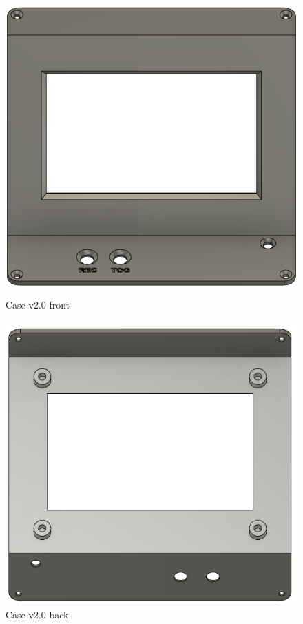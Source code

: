\begin{figure}[htbp]
    \centering
    \begin{minipage}{0.45\textwidth}
        \centering
        \includegraphics[width=\textwidth]{assets/Deckel v2.0 front.png}
        \caption{Case v2.0 front}
        \label{fig:case_v2_front}
    \end{minipage}
    \hfill
    \begin{minipage}{0.45\textwidth}
        \centering
        \includegraphics[width=\textwidth]{assets/Deckel v2.0_Rueckseite.png}
        \caption{Case v2.0 back}
        \label{fig:case_v2_back}
    \end{minipage}
\end{figure}

